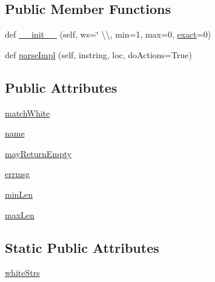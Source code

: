 \subsection*{Public Member Functions}
\begin{DoxyCompactItemize}
\item 
def \hyperlink{classpkg__resources_1_1__vendor_1_1pyparsing_1_1White_a792c04c5fbca98c7c1ec77d9713eb7fa}{\+\_\+\+\_\+init\+\_\+\+\_\+} (self, ws=\char`\"{} \textbackslash{}\textbackslash{}, min=1, max=0, \hyperlink{namespacepkg__resources_1_1__vendor_1_1pyparsing_ae9d6f7275e1682d3bbe5f644beec6b8e}{exact}=0)
\item 
def \hyperlink{classpkg__resources_1_1__vendor_1_1pyparsing_1_1White_a5e6ed35a8adef6f1520a354a1a2b2832}{parse\+Impl} (self, instring, loc, do\+Actions=True)
\end{DoxyCompactItemize}
\subsection*{Public Attributes}
\begin{DoxyCompactItemize}
\item 
\hyperlink{classpkg__resources_1_1__vendor_1_1pyparsing_1_1White_ad1c535ca7658fa4f0f5aff78167f9d75}{match\+White}
\item 
\hyperlink{classpkg__resources_1_1__vendor_1_1pyparsing_1_1White_a072fa84bdfd8a6b2a318b0a09246c8f3}{name}
\item 
\hyperlink{classpkg__resources_1_1__vendor_1_1pyparsing_1_1White_ab8d394aea9db07867c3619a2fd6c64f4}{may\+Return\+Empty}
\item 
\hyperlink{classpkg__resources_1_1__vendor_1_1pyparsing_1_1White_a484edfe7ddd6485da47463b483c0180c}{errmsg}
\item 
\hyperlink{classpkg__resources_1_1__vendor_1_1pyparsing_1_1White_ac84717e4d431a0cd7b758a3c85d91a32}{min\+Len}
\item 
\hyperlink{classpkg__resources_1_1__vendor_1_1pyparsing_1_1White_af831a654b09cfebb9ebf5c9f52c8ad5d}{max\+Len}
\end{DoxyCompactItemize}
\subsection*{Static Public Attributes}
\begin{DoxyCompactItemize}
\item 
\hyperlink{classpkg__resources_1_1__vendor_1_1pyparsing_1_1White_a8acb9cbc303d6613f0cd129e6a707ccd}{white\+Strs}
\end{DoxyCompactItemize}
